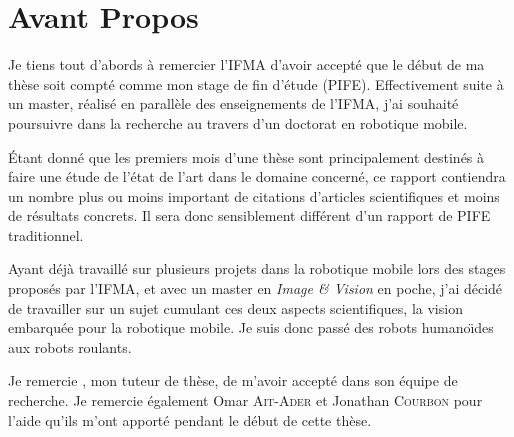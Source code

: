 \section*{Avant Propos}

Je tiens tout d'abords à remercier l'IFMA d'avoir accepté que le début de ma thèse soit compté comme mon stage de fin d'étude (PIFE).
Effectivement suite à un master, réalisé en parallèle des enseignements de l'IFMA, j'ai souhaité poursuivre dans la recherche au travers d'un doctorat en robotique mobile.

\'Etant donné que les premiers mois d'une thèse sont principalement destinés à faire une étude de l'état de l'art dans le domaine concerné, ce rapport contiendra un nombre plus ou moins important de citations d'articles scientifiques et moins de résultats concrets. Il sera donc sensiblement différent d'un rapport de PIFE traditionnel.

Ayant déjà travaillé sur plusieurs projets dans la robotique mobile lors des stages proposés par l'IFMA, et avec un master en \emph{Image \& Vision} en poche, j'ai décidé de travailler sur un sujet cumulant ces deux aspects scientifiques, la vision embarquée pour la robotique mobile. Je suis donc passé des robots humano\"{\i}des aux robots roulants.

Je remercie \tuteur, mon tuteur de thèse, de m'avoir accepté dans son équipe de recherche. Je remercie également Omar \textsc{Ait-Ader} et Jonathan \textsc{Courbon} pour l'aide qu'ils m'ont apporté pendant le début de cette thèse.